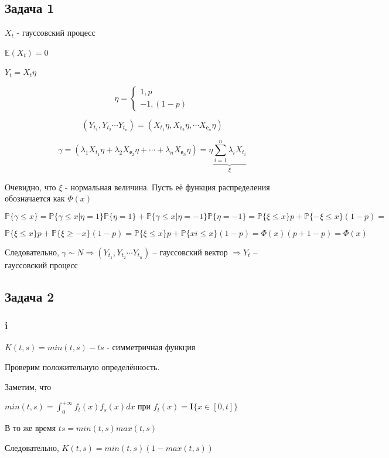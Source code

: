 \documentclass[a4paper,12pt]{article}
\def \mbf{\mathbf}
\def \mbb{\mathbb}
\def \P{\mbb{P}}
\def \E{\mbb{E}}
\def \I{\mbf{I}}
\begin{document}
\subsection{Задача 1}

$ X_t $ - гауссовский процесс

 $ \E(X_t) = 0 $
 
  $ Y_t = X_t\eta $
  
\[   \eta = \begin{cases}
 1, p\\
 -1, (1-p)
 \end{cases}  \]
 
 \[ (Y_{t_1}, Y_{t_2} \cdots Y_{t_n}) = (X_{t_1}\eta, X_{е_2}\eta, \cdots X_{е_n}\eta) \]
 
 \[ \gamma =(\lambda_1 X_{t_1}\eta + \lambda_2 X_{е_2}\eta + \cdots + \lambda_n X_{е_n}\eta) = \eta \underbrace{ \sum_{i = 1}^{n}\lambda_i X_{t_i} }_{\xi} \]
 
 Очевидно, что $ \xi $ - нормальная величина. Пусть её функция распределения обозначается как $ \Phi(x) $
 
 \[ \P\{\gamma \le x\} = \P\{\gamma \le x | \eta = 1\} \P\{\eta = 1\} +  \P\{\gamma \le x | \eta = -1\} \P\{\eta = -1\} = \P\{ \xi \le x \}p + \P\{ -\xi \le x \}(1-p) = \] 
 
 \[ \P\{ \xi \le x \}p + \P\{ \xi \ge -x \}(1-p) =  \P\{ \xi \le x \}p + \P\{ xi \le  x \}(1-p)  = \Phi(x)(p + 1 - p) = \Phi(x)\]
 
 Следовательно, $ \gamma \sim N \Rightarrow  (Y_{t_1}, Y_{t_2} \cdots Y_{t_n}) $ -- гауссовский вектор $ \Rightarrow Y_t $ -- гауссовский процесс 
 
 
 \subsection{Задача 2}
 
 \subsubsection{i}
 
 $ K(t,s) = min(t,s) - ts $ - симметричная функция
 
 Проверим положительную определённость.
 
 Заметим, что 
 
	$ min(t,s) = \int_{0}^{+\infty} f_t(x) f_s(x) dx  $ при   $ f_t(x) = \I\{ x \in [0,t] \} $
	
	В то же время $ ts = min(t,s)max(t,s)$
	
	Следовательно, $  K(t,s) = min(t,s)(1-max(t,s)) $
	
\end{document}
